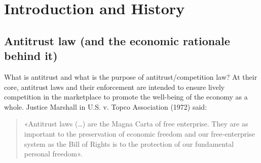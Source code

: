 \chapter{Introduction and History}
\vspace{-1.5cm}

{\chaptoc\noindent\begin{minipage}[inner sep=0,outer sep=0]{0.9\linewidth}\section{Antitrust law (and the economic rationale behind it)}\end{minipage}}

    What is antitrust and what is the purpose of antitrust/competition law? 
    At their core, antitrust laws and their enforcement are intended to ensure lively competition in the marketplace to promote the well-being of the economy as a whole.
    Justice Marshall in U.S. v. Topco Association (1972) said:
    \begin{quote}
        «Antitrust laws (…) are the Magna Carta of free enterprise. They are as important to the preservation of economic freedom and our free-enterprise system as the Bill of Rights is to the protection of our fundamental personal freedom». 
    \end{quote}

